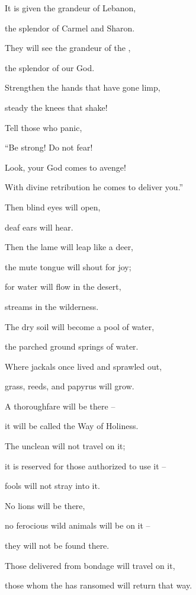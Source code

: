 {\par }{\Q It is given
the grandeur
of Lebanon,
\par }{\Q the splendor
of Carmel
and Sharon.
\par }{\Q They
will see
the grandeur
of the {},
\par }{\Q the splendor
of our God.
\par }{\Q {}Strengthen
the hands
that have gone limp,
\par }{\Q steady
the knees
that shake!
\par }{\Q {}Tell
those who panic,
\par }{\Q “Be strong! Do not
fear!
\par }{\Q Look,
your God
comes
to avenge!
\par }{\Q With divine
retribution
he comes
to deliver you.”
\par }{\Q {}Then
blind
eyes
will open,
\par }{\Q deaf
ears will hear.
\par }{\Q {}Then
the lame
will leap
like a deer,
\par }{\Q the mute
tongue
will shout
for joy;
\par }{\Q for
water
will flow
in the desert,
\par }{\Q streams
in the wilderness.
\par }{\Q {}The dry soil
will become
a pool
of water,
\par }{\Q the parched ground
springs
of water.
\par }{\Q Where jackals
once lived and sprawled out,
\par }{\Q grass,
reeds,
and papyrus will grow.
\par }{\Q {}A thoroughfare
will be there
–
\par }{\Q it will be called
the Way
of Holiness.
\par }{\Q The unclean
will not
travel
on
it;
\par }{\Q it is reserved for those authorized to use it –
\par }{\Q fools will not stray into it.
\par }{\Q {}No
lions
will be
there,
\par }{\Q no ferocious
wild animals will be on it –
\par }{\Q they will not be found there.
\par }{\Q Those delivered from bondage will travel on it,
\par }{\Q {}those whom the
{}
has ransomed
will return
that way.

}
